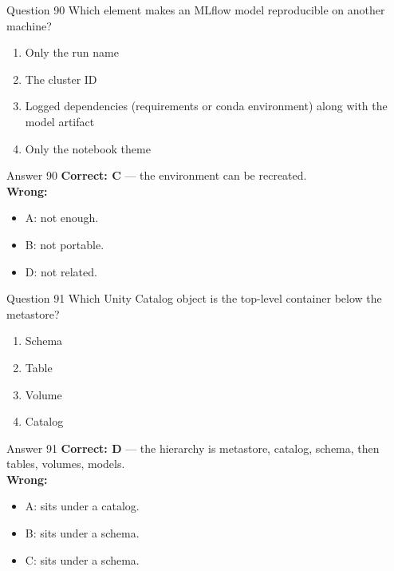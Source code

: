 \documentclass[aspectratio=169,11pt]{beamer}
\begin{document}
\begin{frame}{Question 90}
Which element makes an MLflow model reproducible on another machine?
\begin{enumerate}[label=\Alph*.]
\item Only the run name
\item The cluster ID
\item Logged dependencies (requirements or conda environment) along with the model artifact
\item Only the notebook theme
\end{enumerate}
\end{frame}
\begin{frame}{Answer 90}
\textbf{Correct: C} --- the environment can be recreated.\\
\vspace{0.5em}
\textbf{Wrong:}
\begin{itemize}
\item A: not enough.
\item B: not portable.
\item D: not related.
\end{itemize}
\end{frame}

\begin{frame}{Question 91}
Which Unity Catalog object is the top-level container below the metastore?
\begin{enumerate}[label=\Alph*.]
\item Schema
\item Table
\item Volume
\item Catalog
\end{enumerate}
\end{frame}
\begin{frame}{Answer 91}
\textbf{Correct: D} --- the hierarchy is metastore, catalog, schema, then tables, volumes, models.\\
\vspace{0.5em}
\textbf{Wrong:}
\begin{itemize}
\item A: sits under a catalog.
\item B: sits under a schema.
\item C: sits under a schema.
\end{itemize}
\end{frame}
\end{document}
